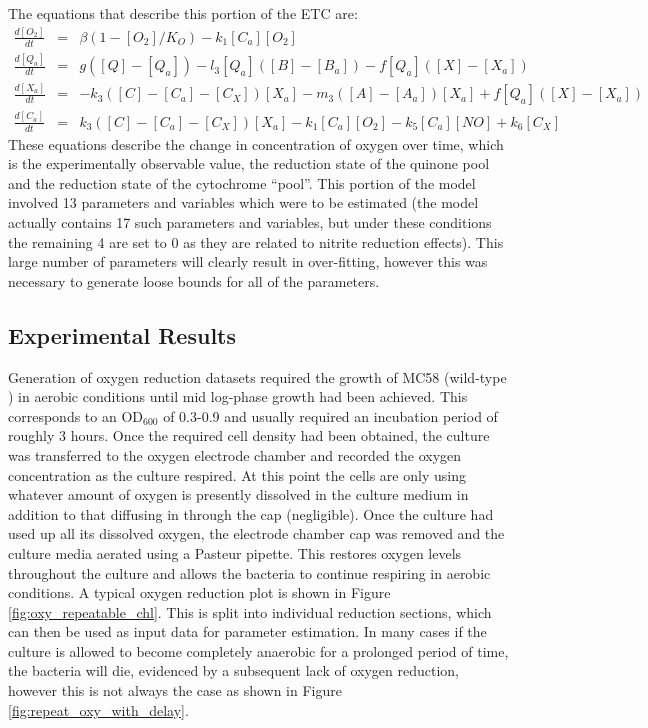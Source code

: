 The equations that describe this portion of the ETC are:
\begin{eqnarray*}
\frac{d[O_2]}{dt} & = & \beta(1-[O_2]/K_O) - k_{1}[C_a][O_2]\\
\frac{d[Q_a]}{dt} & = & g([Q] - [Q_a]) - l_3[Q_a]([B] - [B_a]) - f[Q_a]([X]-[X_a])\\
\frac{d[X_a]}{dt} & = & -k_3([C] - [C_a] - [C_X])[X_a]  - m_3([A] - [A_a])[X_a] + f[Q_a]([X]-[X_a])\\
\frac{d[C_a]}{dt} & = & k_3([C] - [C_a] - [C_X])[X_a] - k_{1}[C_a][O_2] - k_5[C_a][NO] + k_6[C_X]
\end{eqnarray*}
These equations describe the change in concentration of oxygen over time, which is the experimentally observable value, the reduction state of the quinone pool and the reduction state of the cytochrome ``pool''. This portion of the model involved 13 parameters and variables which were to be estimated (the model actually contains 17 such parameters and variables, but under these conditions the remaining 4 are set to 0 as they are related to nitrite reduction effects). This large number of parameters will clearly result in over-fitting, however this was necessary to generate loose bounds for all of the parameters.

\subsection{Experimental Results}
Generation of oxygen reduction datasets required the growth of MC58 (wild-type \Nsm{}) in aerobic conditions until mid log-phase growth had been achieved. This corresponds to an $\mathrm{OD}_{600}$ of 0.3-0.9 and usually required an incubation period of roughly 3 hours. Once the required cell density had been obtained, the  culture was transferred to the oxygen electrode chamber and recorded the oxygen concentration as the culture respired. At this point the cells are only using whatever amount of oxygen is presently dissolved in the culture medium in addition to that diffusing in through the cap (negligible). Once the culture had used up all its dissolved oxygen, the electrode chamber cap was removed and the culture media aerated using a Pasteur pipette. This restores oxygen levels throughout the culture and allows the bacteria to continue respiring in aerobic conditions. A typical oxygen reduction plot is shown in Figure \ref{fig:oxy_repeatable_chl}. This is split into individual reduction sections, which can then be used as input data for parameter estimation. In many cases if the culture is allowed to become completely anaerobic for a prolonged period of time, the bacteria will die, evidenced by a subsequent lack of oxygen reduction, however this is not always the case as shown in Figure \ref{fig:repeat_oxy_with_delay}.

